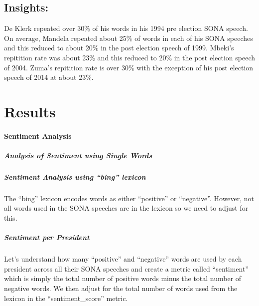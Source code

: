 \documentclass[]{article}
\let\oldparagraph\paragraph
\renewcommand{\paragraph}[1]{\oldparagraph{#1}\mbox{}}
\let\oldsubparagraph\subparagraph
\renewcommand{\subparagraph}[1]{\oldsubparagraph{#1}\mbox{}}
\begin{document}
\hypertarget{insights-5}{%
\subsection{\texorpdfstring{\textbf{Insights:}}{Insights:}}\label{insights-5}}

De Klerk repeated over 30\% of his words in his 1994 pre election SONA
speech. On average, Mandela repeated about 25\% of words in each of his
SONA speeches and this reduced to about 20\% in the post election speech
of 1999. Mbeki's repitition rate was about 23\% and this reduced to 20\%
in the post election speech of 2004. Zuma's repitition rate is over 30\%
with the exception of his post election speech of 2014 at about 23\%.

\hypertarget{results}{%
\section{\texorpdfstring{\textbf{Results}}{Results}}\label{results}}

\hypertarget{sentiment-analysis}{%
\paragraph{\texorpdfstring{\textbf{Sentiment
Analysis}}{Sentiment Analysis}}\label{sentiment-analysis}}

\hypertarget{analysis-of-sentiment-using-single-words}{%
\subparagraph{\texorpdfstring{\textbf{Analysis of Sentiment using Single
Words}}{Analysis of Sentiment using Single Words}}\label{analysis-of-sentiment-using-single-words}}

\hypertarget{sentiment-analysis-using-bing-lexicon}{%
\subparagraph{\texorpdfstring{\textbf{Sentiment Analysis using ``bing''
lexicon}}{Sentiment Analysis using ``bing'' lexicon}}\label{sentiment-analysis-using-bing-lexicon}}

The ``bing'' lexicon encodes words as either ``positive'' or
``negative''. However, not all words used in the SONA speeches are in
the lexicon so we need to adjust for this.

\hypertarget{sentiment-per-president}{%
\subparagraph{\texorpdfstring{\textbf{Sentiment per
President}}{Sentiment per President}}\label{sentiment-per-president}}

Let's understand how many ``positive'' and ``negative'' words are used
by each president across all their SONA speeches and create a metric
called ``sentiment'' which is simply the total number of positive words
minus the total number of negative words. We then adjust for the total
number of words used from the lexicon in the ``sentiment\_score''
metric.
\end{document}
